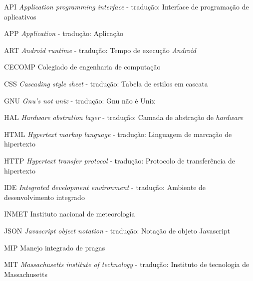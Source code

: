 \begin{KeepFromToc}
\listoffigures
\cleardoublepage


\listoftables
\cleardoublepage

\makeatletter
\let\l@listing\l@figure
\def\newfloat@listoflisting@hook{\let\figurename\listingname}
\makeatother

\listoflistings

\end{KeepFromToc}
\begin{siglas}
	\item[API]      \textit{Application programming interface} - tradução: Interface de programação de aplicativos
    \item[APP]		\textit{Application} - tradução: Aplicação
	\item[ART]      \textit{Android runtime} - tradução: Tempo de execução \textit{Android}
	\item[CECOMP]	Colegiado de engenharia de computação
	\item[CSS]      \textit{Cascading style sheet} - tradução: Tabela de estilos em cascata
    \item[GNU]		\textit{Gnu's not unix} - tradução: Gnu não é Unix
	\item[HAL]      \textit{Hardware abstration layer} - tradução: Camada de abstração de \textit{hardware} 
	\item[HTML]     \textit{Hypertext markup language} - tradução: Linguagem  de marcação de hipertexto
	\item[HTTP]     \textit{Hypertext transfer protocol} - tradução: Protocolo de transferência de hipertexto
	\item[IDE]      \textit{Integrated development environment} - tradução: Ambiente de desenvolvimento integrado
	\item[INMET]	Instituto nacional de meteorologia
    \item[JSON]	    \textit{Javascript object notation} - tradução: Notação de objeto Javascript
	\item[MIP]      Manejo integrado de pragas
    \item[MIT]		\textit{Massachusetts institute of technology} - tradução: Instituto de tecnologia de Massachusetts

\end{siglas}
